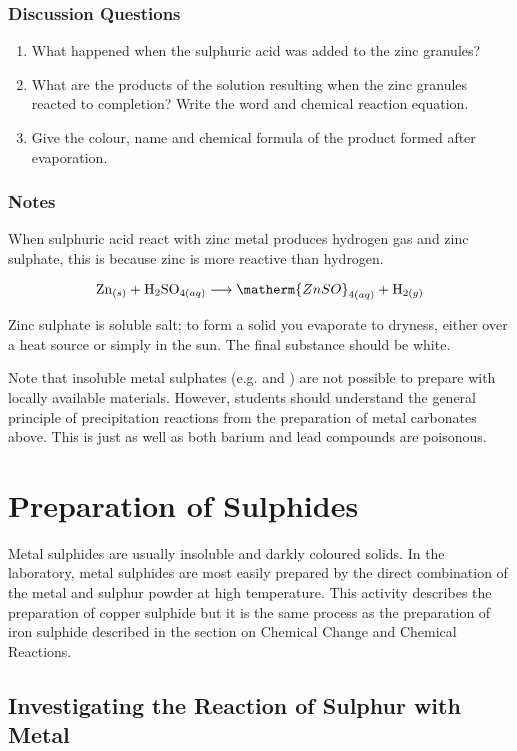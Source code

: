 \subsubsection*{Discussion Questions}
\begin{enumerate}
\item{What happened when the sulphuric acid was added to the zinc granules?}
\item{What are the products of the solution resulting when the zinc granules reacted to completion? Write the word and chemical reaction equation.}
\item{Give the colour, name and chemical formula of the product formed after evaporation.}
\end{enumerate}

\subsubsection*{Notes}
When sulphuric acid react with zinc metal produces hydrogen gas and zinc sulphate, this is because zinc is more reactive than hydrogen.

$$ \mathrm{Zn}_{(s)} + \mathrm{H}_2\mathrm{SO}_{4(aq)} \longrightarrow \matherm{ZnSO}_{4(aq)} + \mathrm{H}_{2(g)} $$

Zinc sulphate is soluble salt; to form a solid you evaporate to dryness, either over a heat source or simply in the sun. The final substance should be white.

Note that insoluble metal sulphates (e.g.  and ) are not possible to prepare with locally available materials. However, students should understand the general principle of precipitation reactions from the preparation of metal carbonates above. This is just as well as both barium and lead compounds are poisonous.

\section{Preparation of Sulphides}

Metal sulphides are usually insoluble and darkly coloured solids. In the laboratory, metal sulphides are most easily prepared by the direct combination of the metal and sulphur powder at high temperature. This activity describes the preparation of copper sulphide but it is the same process as the preparation of iron sulphide described in the section on Chemical Change and Chemical Reactions.

\subsection{Investigating the Reaction of Sulphur with Metal}

